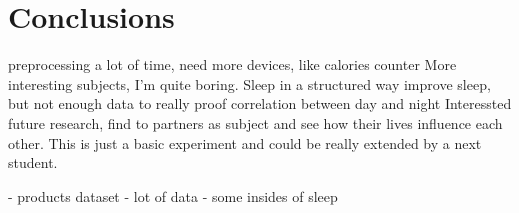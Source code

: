\section{Conclusions}
	preprocessing a lot of time, 
	need more devices, like calories counter
	More interesting subjects, I'm quite boring. 
	Sleep in a structured way improve sleep, 
		but not enough data to really proof correlation between day and night
	Interessted future research, find to partners as subject and see how their lives influence each other.
	This is just a basic experiment and could be really extended by a next student.


	- products dataset
	- lot of data
	-  some insides of sleep
